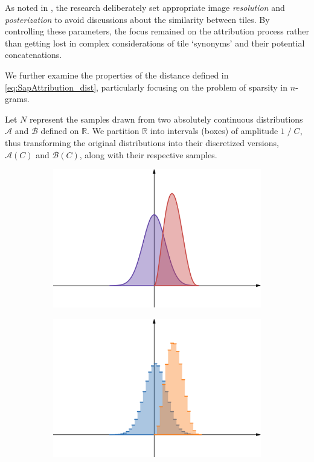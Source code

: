 \noindent As noted in \cite{thesis}, the research deliberately set appropriate image \textit{resolution} and \textit{posterization} to avoid discussions about the similarity between tiles. By controlling these parameters, the focus remained on the attribution process rather than getting lost in complex considerations of tile ‘synonyms’ and their potential concatenations.

\bigskip
We further examine the properties of the distance defined in  \cref{eq:SapAttribution_dist}, particularly focusing on the problem of sparsity in $n$-grams.

\noindent Let $N$ represent the samples drawn from two absolutely continuous distributions $\mathcal{A}$ and $\mathcal{B}$ defined on $\mathbb{R}$. We partition $\mathbb{R}$ into intervals (boxes) of amplitude $1 \; / \; C$, thus transforming the original distributions into their discretized versions, $\mathcal{A}(C)$ and $\mathcal{B}(C)$, along with their respective samples.

\begin{figure}[ht]
	\centering
	\begin{subfigure}{0.45\linewidth}
		\includegraphics[width=\linewidth]{Figures/exnmodel_AB_cont.png}
	\end{subfigure} \begin{subfigure}{0.45\linewidth}
		\includegraphics[width=\linewidth]{Figures/exnmodel_AB_disc.png}
	\end{subfigure}
\end{figure}

